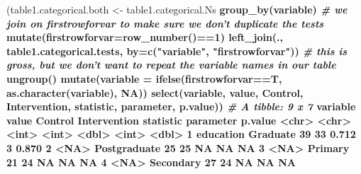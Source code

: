 \documentclass[]{article}
\newenvironment{Shaded}{\begin{snugshade}}{\end{snugshade}}
\newcommand{\CommentTok}[1]{\textcolor[rgb]{0.56,0.35,0.01}{\textit{#1}}}
\newcommand{\DataTypeTok}[1]{\textcolor[rgb]{0.13,0.29,0.53}{#1}}
\newcommand{\DecValTok}[1]{\textcolor[rgb]{0.00,0.00,0.81}{#1}}
\newcommand{\ErrorTok}[1]{\textcolor[rgb]{0.64,0.00,0.00}{\textbf{#1}}}
\newcommand{\FloatTok}[1]{\textcolor[rgb]{0.00,0.00,0.81}{#1}}
\newcommand{\KeywordTok}[1]{\textcolor[rgb]{0.13,0.29,0.53}{\textbf{#1}}}
\newcommand{\NormalTok}[1]{#1}
\newcommand{\OperatorTok}[1]{\textcolor[rgb]{0.81,0.36,0.00}{\textbf{#1}}}
\newcommand{\OtherTok}[1]{\textcolor[rgb]{0.56,0.35,0.01}{#1}}
\newcommand{\StringTok}[1]{\textcolor[rgb]{0.31,0.60,0.02}{#1}}
\begin{document}
\begin{Shaded}
\begin{Highlighting}[]
\NormalTok{(table1.categorical.both <-}\StringTok{ }\NormalTok{table1.categorical.Ns }\OperatorTok{%
\StringTok{  }\KeywordTok{group_by}\NormalTok{(variable) }\OperatorTok{%
\StringTok{  }\CommentTok{# we join on firstrowforvar to make sure we don't duplicate the tests}
\StringTok{  }\KeywordTok{mutate}\NormalTok{(}\DataTypeTok{firstrowforvar=}\KeywordTok{row_number}\NormalTok{()}\OperatorTok{==}\DecValTok{1}\NormalTok{) }\OperatorTok{%
\StringTok{  }\KeywordTok{left_join}\NormalTok{(., table1.categorical.tests, }\DataTypeTok{by=}\KeywordTok{c}\NormalTok{(}\StringTok{"variable"}\NormalTok{, }\StringTok{"firstrowforvar"}\NormalTok{)) }\OperatorTok{%
\StringTok{  }\CommentTok{# this is gross, but we don't want to repeat the variable names in our table}
\StringTok{  }\KeywordTok{ungroup}\NormalTok{() }\OperatorTok{%
\StringTok{  }\KeywordTok{mutate}\NormalTok{(}\DataTypeTok{variable =} \KeywordTok{ifelse}\NormalTok{(firstrowforvar}\OperatorTok{==}\NormalTok{T, }\KeywordTok{as.character}\NormalTok{(variable), }\OtherTok{NA}\NormalTok{)) }\OperatorTok{%
\StringTok{  }\KeywordTok{select}\NormalTok{(variable, value, Control, Intervention, statistic, parameter, p.value))}
\CommentTok{# A tibble: 9 x 7}
\NormalTok{  variable  value          Control Intervention statistic parameter p.value}
  \OperatorTok{<}\NormalTok{chr}\OperatorTok{>}\StringTok{     }\ErrorTok{<}\NormalTok{chr}\OperatorTok{>}\StringTok{            }\ErrorTok{<}\NormalTok{int}\OperatorTok{>}\StringTok{        }\ErrorTok{<}\NormalTok{int}\OperatorTok{>}\StringTok{     }\ErrorTok{<}\NormalTok{dbl}\OperatorTok{>}\StringTok{     }\ErrorTok{<}\NormalTok{int}\OperatorTok{>}\StringTok{   }\ErrorTok{<}\NormalTok{dbl}\OperatorTok{>}
\DecValTok{1}\NormalTok{ education Graduate            }\DecValTok{39}           \DecValTok{33}     \FloatTok{0.712}         \DecValTok{3}   \FloatTok{0.870}
\DecValTok{2} \OperatorTok{<}\OtherTok{NA}\OperatorTok{>}\StringTok{      }\NormalTok{Postgraduate        }\DecValTok{25}           \DecValTok{25}    \OtherTok{NA}            \OtherTok{NA}  \OtherTok{NA}    
\DecValTok{3} \OperatorTok{<}\OtherTok{NA}\OperatorTok{>}\StringTok{      }\NormalTok{Primary             }\DecValTok{21}           \DecValTok{24}    \OtherTok{NA}            \OtherTok{NA}  \OtherTok{NA}    
\DecValTok{4} \OperatorTok{<}\OtherTok{NA}\OperatorTok{>}\StringTok{      }\NormalTok{Secondary           }\DecValTok{27}           \DecValTok{24}    \OtherTok{NA}            \OtherTok{NA}  \OtherTok{NA}    
}}}}}}
\end{Highlighting}
\end{Shaded}
\end{document}
